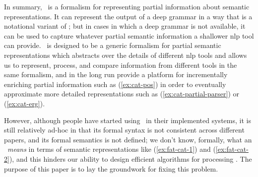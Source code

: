 In summary, \rmrs\ is a formalism for representing partial information
about semantic representations.  It can
represent the output of a deep grammar in a way that is a notational
variant of \mrs; but in cases in which a deep grammar is not
available, it can be used to capture whatever partial semantic
information a shallower {\sc nlp} tool can provide.  \rmrs\ is
designed to be a generic formalism for partial semantic
representations which abstracts over the details of different {\sc nlp}
tools and allows us to represent, process, and compare information
from different tools in the same formalism, and in the long run
provide a platform for incrementally enriching partial information
such as (\ref{ex:cat-pos}) in order to eventually approximate more
detailed representations such as (\ref{ex:cat-partial-parser}) or
(\ref{ex:cat-erg}).

However, although people have started using \rmrs\ in their
implemented systems, it is still relatively ad-hoc in that its formal
syntax is not consistent across different papers, and its formal
semantics is not defined; we don't know, formally, what an \rmrs\
\emph{means} in terms of semantic representations like
(\ref{ex:fat-cat-1}) and (\ref{ex:fat-cat-2}), and this hinders our
ability to design efficient algorithms for processing \rmrs. The
purpose of this paper is to lay the groundwork for fixing this problem.

